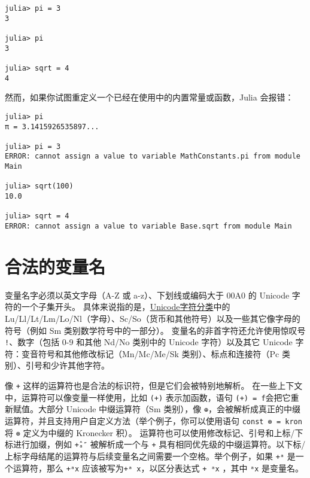 \begin{verbatim}
julia> pi = 3
3

julia> pi
3

julia> sqrt = 4
4
\end{verbatim}



然而，如果你试图重定义一个已经在使用中的内置常量或函数，Julia 会报错：




\begin{verbatim}
julia> pi
π = 3.1415926535897...

julia> pi = 3
ERROR: cannot assign a value to variable MathConstants.pi from module Main

julia> sqrt(100)
10.0

julia> sqrt = 4
ERROR: cannot assign a value to variable Base.sqrt from module Main
\end{verbatim}



\hypertarget{14662919506992032303}{}


\section{合法的变量名}



变量名字必须以英文字母（A-Z 或 a-z）、下划线或编码大于 00A0 的 Unicode 字符的一个子集开头。 具体来说指的是，\href{http://www.fileformat.info/info/unicode/category/index.htm}{Unicode字符分类}中的 Lu/Ll/Lt/Lm/Lo/Nl（字母）、Sc/So（货币和其他符号）以及一些其它像字母的符号（例如 Sm 类别数学符号中的一部分）。 变量名的非首字符还允许使用惊叹号 \texttt{!}、数字（包括 0-9 和其他 Nd/No 类别中的 Unicode 字符）以及其它 Unicode 字符：变音符号和其他修改标记（Mn/Mc/Me/Sk 类别）、标点和连接符（Pc 类别）、引号和少许其他字符。



像 \texttt{+} 这样的运算符也是合法的标识符，但是它们会被特别地解析。 在一些上下文中，运算符可以像变量一样使用，比如 \texttt{(+)} 表示加函数，语句 \texttt{(+) = f}会把它重新赋值。大部分 Unicode 中缀运算符（Sm 类别），像 \texttt{⊕}，会被解析成真正的中缀运算符，并且支持用户自定义方法（举个例子，你可以使用语句 \texttt{const ⊗ = kron}将 \texttt{⊗} 定义为中缀的 Kronecker 积）。 运算符也可以使用修改标记、引号和上标/下标进行加缀，例如 \texttt{+̂ₐ″} 被解析成一个与 \texttt{+} 具有相同优先级的中缀运算符。以下标/上标字母结尾的运算符与后续变量名之间需要一个空格。举个例子，如果 \texttt{+ᵃ} 是一个运算符，那么 \texttt{+ᵃx} 应该被写为\texttt{+ᵃ x}，以区分表达式 \texttt{+ ᵃx} ，其中 \texttt{ᵃx} 是变量名。



